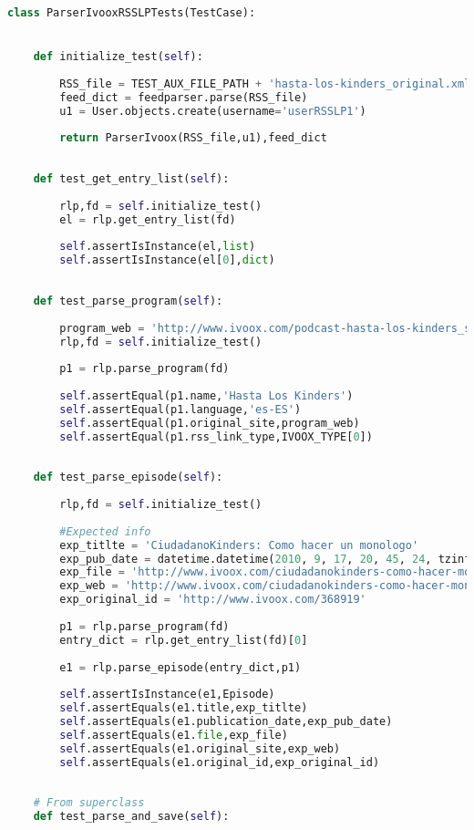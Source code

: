 \begin{lstlisting}[language=Python, caption=Probas de unidade dos metodos de ParserIvoox, label=lst:ivooxtest]
class ParserIvooxRSSLPTests(TestCase):


	def initialize_test(self):
	
		RSS_file = TEST_AUX_FILE_PATH + 'hasta-los-kinders_original.xml'
		feed_dict = feedparser.parse(RSS_file)
		u1 = User.objects.create(username='userRSSLP1')
		
		return ParserIvoox(RSS_file,u1),feed_dict
	
	
	def test_get_entry_list(self):
	
		rlp,fd = self.initialize_test()
		el = rlp.get_entry_list(fd)
		
		self.assertIsInstance(el,list)
		self.assertIsInstance(el[0],dict)
	
	
	def test_parse_program(self):
	
		program_web = 'http://www.ivoox.com/podcast-hasta-los-kinders_sq_f14062_1.html'
		rlp,fd = self.initialize_test()
		
		p1 = rlp.parse_program(fd)
		
		self.assertEqual(p1.name,'Hasta Los Kinders')
		self.assertEqual(p1.language,'es-ES')
		self.assertEqual(p1.original_site,program_web)
		self.assertEqual(p1.rss_link_type,IVOOX_TYPE[0])
	
	
	def test_parse_episode(self):
	
		rlp,fd = self.initialize_test()
		
		#Expected info
		exp_titlte = 'CiudadanoKinders: Como hacer un monologo'
		exp_pub_date = datetime.datetime(2010, 9, 17, 20, 45, 24, tzinfo=pytz.utc)
		exp_file = 'http://www.ivoox.com/ciudadanokinders-como-hacer-monologo_mf_368919_feed_1.mp3'
		exp_web = 'http://www.ivoox.com/ciudadanokinders-como-hacer-monologo-audios-mp3_rf_368919_1.html'
		exp_original_id = 'http://www.ivoox.com/368919'
		
		p1 = rlp.parse_program(fd)
		entry_dict = rlp.get_entry_list(fd)[0]
		
		e1 = rlp.parse_episode(entry_dict,p1)
		
		self.assertIsInstance(e1,Episode)
		self.assertEquals(e1.title,exp_titlte)
		self.assertEquals(e1.publication_date,exp_pub_date)
		self.assertEquals(e1.file,exp_file)
		self.assertEquals(e1.original_site,exp_web)
		self.assertEquals(e1.original_id,exp_original_id)
	
	
	# From superclass
	def test_parse_and_save(self):
		

\end{lstlisting}
